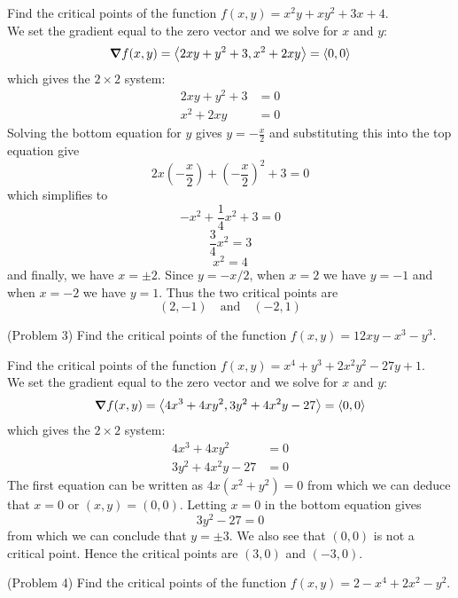 \documentclass[handout]{ximera}
\begin{document}
\begin{example}[Example 3]
Find the critical points of the function $f(x,y) = x^2y +xy^2 +3x + 4$.\\
We set the gradient equal to the zero vector and we solve for $x$ and $y$:
\[
\boldsymbol\nabla f(x,y) = \left\langle 2xy + y^2 + 3, x^2 + 2xy\right\rangle = \left\langle 0,0\right\rangle
\]
which gives the $2 \times 2$ system:
\begin{align*}
2xy + y^2 +3  &= 0\\
x^2 + 2xy & = 0
\end{align*}
Solving the bottom equation for $y$ gives $y = -\frac{x}{2}$ and substituting this into the top equation give
\[
2x\left(-\frac{x}{2}\right) + \left(-\frac{x}{2}\right)^2 +3 = 0
\]
which simplifies to
\[
-x^2 + \frac14 x^2 + 3 =0
\]
\[
\frac34 x^2 = 3
\]
\[
x^2 = 4
\]
and finally, we have $x=\pm 2$. Since $y = -x/2$, when $x=2$ we have $y=-1$ and when $x = -2$ we have $y = 1$.
Thus the two critical points are
\[
(2,-1) \quad \text{and} \quad (-2, 1)
\]
\end{example}

\begin{problem}(Problem 3)
Find the critical points of the function $f(x,y) = 12xy - x^3 - y^3$.
\end{problem}



\begin{example}[Example 4]
Find the critical points of the function $f(x,y) = x^4 + y^3 + 2x^2y^2 -27y + 1$.\\
We set the gradient equal to the zero vector and we solve for $x$ and $y$:
\[
\boldsymbol\nabla f(x,y) = \left\langle 4x^3 + 4xy^2, 3y^2 + 4x^2y -27\right\rangle = \left\langle 0,0\right\rangle
\]
which gives the $2 \times 2$ system:
\begin{align*}
4x^3 + 4xy^2 &= 0\\
3y^2 + 4x^2y -27 &= 0
\end{align*}
The first equation can be written as $4x(x^2 + y^2) = 0$ from which we can deduce that $x = 0$ or $(x, y) = (0,0)$. 
Letting $x = 0$ in the bottom equation gives
\[
3y^2 - 27 = 0
\]
from which we can conclude that $y = \pm 3$. We also see that $(0,0)$ is not a critical point.
Hence the critical points are $(3,0)$ and $(-3,0)$.
\end{example}

\begin{problem}(Problem 4)
Find the critical points of the function $f(x,y) = 2-x^4 + 2x^2 - y^2$.
\end{problem}
\end{document}
